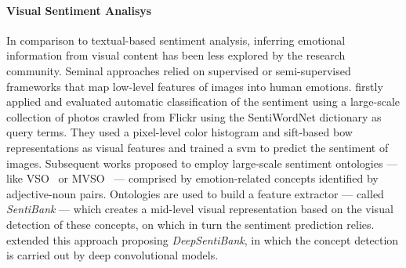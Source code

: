 \paragraph{Visual Sentiment Analisys}
In comparison to textual-based sentiment analysis, inferring emotional information from visual content has been less explored by the research community.
Seminal approaches \cite{machajdik2010affective,siersdorfer2010analyzing,jia2012can} relied on supervised or semi-supervised frameworks that map low-level features of images into human emotions.
\citet{siersdorfer2010analyzing} firstly applied and evaluated automatic classification of the sentiment using a large-scale collection of photos crawled from Flickr using the SentiWordNet \cite{esuli2007sentiwordnet} dictionary as query terms.
They used a pixel-level color histogram and \gls{sift}-based \acrlong{bow} representations as visual features and trained a \gls{svm} to predict the sentiment of images.
Subsequent works \cite{borth2013large,yuan2013sentribute,jou2015visual} proposed to employ large-scale sentiment ontologies --- like VSO~\cite{borth2013large} or MVSO~\cite{jou2015visual} --- comprised by emotion-related concepts identified by adjective-noun pairs.
Ontologies are used to build a feature extractor --- called \emph{SentiBank} --- which creates a mid-level visual representation based on the visual detection of these concepts, on which in turn the sentiment prediction relies.
\citet{chen2014deepsentibank} extended this approach proposing \emph{DeepSentiBank}, in which the concept detection is carried out by deep convolutional models.
